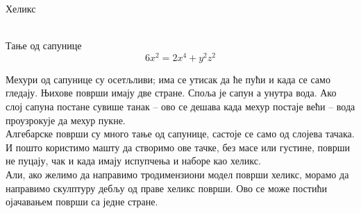\documentclass[sr]{./../../common/SurferDesc}%
\begin{document}
\footnotesize


\begin{surferPage}
  \begin{surferTitle}Хеликс \end{surferTitle}   \\
Тање од сапунице\\
  \smallskip
\[6x^2	= 2x^4	+ y^2	z^2\]

\singlespacing
Мехури од сапунице су осетљливи; има се утисак да ће пући и када се само гледају. Њихове површи имају две стране. Споља је сапун а унутра вода. Ако слој сапуна постане сувише танак – ово се дешава када мехур постаје већи – вода проузрокује да мехур пукне.\\
\vspace{0,3cm}
Алгебарске површи су много тање од сапунице, састоје се само од слојева тачака. И пошто користимо машту да створимо ове тачке, без масе или густине, површи не пуцају, чак и када имају испупчења и наборе као хеликс.\\
\vspace{0,3cm}
Али, ако желимо да направимо тродимензиони модел површи хеликс, морамо да направимо скулптуру дебљу од праве хеликс површи. Ово се може постићи ојачавањем површи са једне стране.

  \begin{surferText}
     \end{surferText}
\end{surferPage}



 
\end{document}
